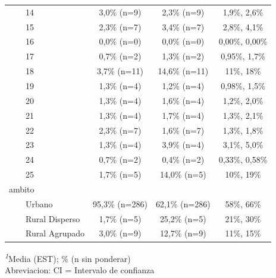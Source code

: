 \documentclass[
  spanish,
  a4paper,
]{scrreprt}
\begin{document}
\begin{table}
{\begin{tabular*}{\linewidth}{@{\extracolsep{\fill}}lccc}
    14 & 3,0\% (n=9) & 2,3\% (n=9) & 1,9\%, 2,6\% \\ 
    15 & 2,3\% (n=7) & 3,4\% (n=7) & 2,8\%, 4,1\% \\ 
    16 & 0,0\% (n=0) & 0,0\% (n=0) & 0,00\%, 0,00\% \\ 
    17 & 0,7\% (n=2) & 1,3\% (n=2) & 0,95\%, 1,7\% \\ 
    18 & 3,7\% (n=11) & 14,6\% (n=11) & 11\%, 18\% \\ 
    19 & 1,3\% (n=4) & 1,2\% (n=4) & 0,98\%, 1,5\% \\ 
    20 & 1,3\% (n=4) & 1,6\% (n=4) & 1,2\%, 2,0\% \\ 
    21 & 1,3\% (n=4) & 1,7\% (n=4) & 1,3\%, 2,1\% \\ 
    22 & 2,3\% (n=7) & 1,6\% (n=7) & 1,3\%, 1,8\% \\ 
    23 & 1,3\% (n=4) & 3,9\% (n=4) & 3,1\%, 5,0\% \\ 
    24 & 0,7\% (n=2) & 0,4\% (n=2) & 0,33\%, 0,58\% \\ 
    25 & 1,7\% (n=5) & 14,0\% (n=5) & 10\%, 19\% \\ 
ambito &  &  &  \\ 
    Urbano & 95,3\% (n=286) & 62,1\% (n=286) & 58\%, 66\% \\ 
    Rural Disperso & 1,7\% (n=5) & 25,2\% (n=5) & 21\%, 30\% \\ 
    Rural Agrupado & 3,0\% (n=9) & 12,7\% (n=9) & 11\%, 15\% \\ 
\bottomrule
\end{tabular*}
\begin{minipage}{\linewidth}
\textsuperscript{\textit{1}}Media (EST); \% (n sin ponderar)\\
Abreviacion: CI = Intervalo de confianza\\
\end{minipage}

}

\end{table}%
\end{document}
